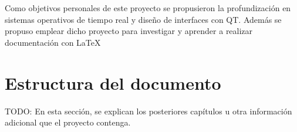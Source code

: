 Como objetivos personales de este proyecto se propusieron la profundización en sistemas operativos de tiempo real y diseño de interfaces con QT. Además se propuso emplear dicho proyecto para investigar y aprender a realizar documentación con \LaTeX


\section{Estructura del documento}
TODO: En esta sección, se explican los posteriores capítulos u otra información adicional que el proyecto contenga.

\chapterend
